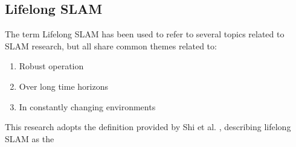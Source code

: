 \subsection{Lifelong SLAM}

The term Lifelong SLAM has been used to refer to several topics related to SLAM research, but all share common themes related to:
\begin{singlespace}
    \begin{enumerate}
        \item Robust operation
        \item Over long time horizons
        \item In constantly changing environments
    \end{enumerate}
\end{singlespace}
This research adopts the definition provided by Shi et al. \cite{shiAreWeReady2020}, describing lifelong SLAM as the 